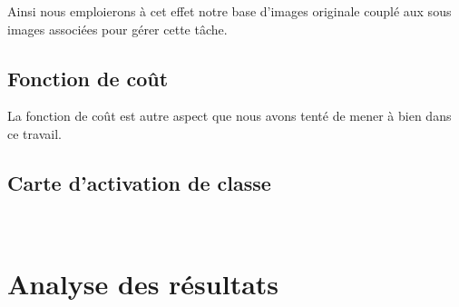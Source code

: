Ainsi nous emploierons à cet effet notre base d'images originale couplé aux sous images associées pour gérer cette tâche.\par

\subsection{Fonction de coût}
La fonction de coût est autre aspect que nous avons tenté de mener à bien dans ce travail.
~\cite{Park2019}
~\cite{Barbu2018}

\subsection{Carte d'activation de classe}
~\cite{jia2017}
\section{Analyse des résultats}